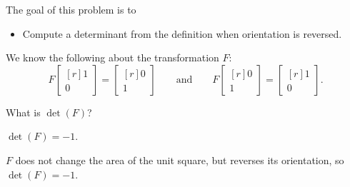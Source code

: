 \documentclass{problemset}
\newcommand{\mat}[1]{\begin{bmatrix*}[r]#1\end{bmatrix*}}
\newcommand{\displayonlynewpage}{\begin{displayonly}\newpage\end{displayonly}}
\begin{document}
	\displayonlynewpage
	\question
	\begin{annotation}
		\begin{goals}

			The goal of this problem is to
			\begin{itemize}
				\item Compute a determinant from the definition when orientation is reversed.
			\end{itemize}
		\end{goals}
	\end{annotation}
	We know the following about the transformation $F$:
	\[
		F\mat{1\\0}=\mat{0\\1}\qquad\text{and}\qquad F\mat{0\\1}=\mat{1\\0}.
	\]
	\begin{parts}
		\item What is $\det(F)$?
			\begin{solution}
				$\det(F)=-1$.

				$F$ does not change the area of the unit square, but reverses its
				orientation, so $\det(F)=-1$.
			\end{solution}
	\end{parts}
\end{document}
